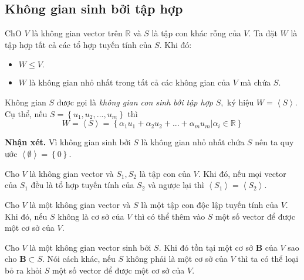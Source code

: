 \subsection{Không gian sinh bởi tập hợp}
\begin{mybox}
\begin{theorem}
ChO $V$ là không gian vector trên $\mathbb{R}$ và $S$ là tập con khác rỗng của $V.$ Ta đặt $W$ là tập hợp tất cả các tổ hợp tuyến tính của $S.$ Khi đó:
\begin{itemize}
\item $W \leqslant V.$
\item $W$ là không gian nhỏ nhất trong tất cả các không gian của $V$ mà chứa $S.$
\end{itemize}
Không gian $S$ được gọi là \textit{không gian con sinh bởi tập hợp} $S,$ ký hiệu $W = \left\langle S \right\rangle.$ Cụ thể, nếu $S = \left\{ {{u_1},{u_2},...,{u_m}} \right\}$ thì
$$W = \left\langle S \right\rangle  = \left\{ {{\alpha _1}{u_1} + {\alpha _2}{u_2} + ... + \left. {{\alpha _m}{u_m}} \right|{\alpha _i} \in \mathbb{R} } \right\}$$
\end{theorem}
\end{mybox}
\begin{mybox}
\textbf{Nhận xét.} Vì không gian sinh bởi $S$ là không gian nhỏ nhất chứa $S$ nên ta quy ước $\left\langle \emptyset  \right\rangle  = \left\{ 0 \right\}.$
\end{mybox}
\begin{mybox}
\begin{theorem}
Cho $V$ là không gian vector và $S_1, S_2$ là tập con của $V.$ Khi đó, nếu mọi vector của $S_1$ đều là tổ hợp tuyến tính của $S_2$ và ngược lại thì $\left\langle {S_1} \right\rangle = \left\langle {S_2} \right\rangle.$
\end{theorem}
\end{mybox}
\begin{mybox}
\begin{theorem}
Cho $V$ là một không gian vector và $S$ là một tập con độc lập tuyến tính của $V.$ Khi đó, nếu $S$ không là cơ sở của $V$ thì có thể thêm vào $S$ một số vector để được một cơ sở của $V.$
\end{theorem}
\end{mybox}
\begin{mybox}
\begin{theorem}
Cho $V$ là một không gian vector sinh bởi $S.$ Khi đó tồn tại một cơ sở $\mathbf{B}$ của $V$ sao cho $\mathbf{B} \subset S.$ Nói cách khác, nếu $S$ không phải là một cơ sở của $V$ thì ta có thể loại bỏ ra khỏi $S$ một số vector để được một cơ sở của $V.$
\end{theorem}
\end{mybox}
